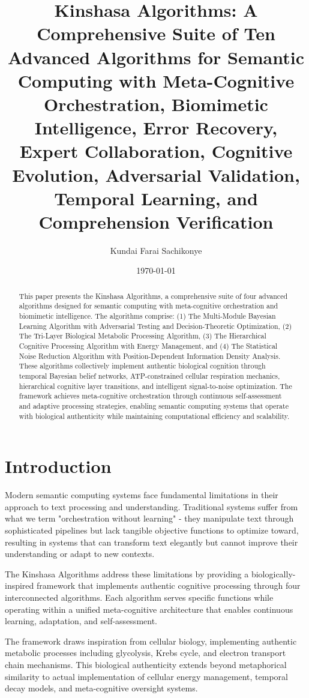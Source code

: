 \documentclass[12pt,a4paper]{article}
\title{Kinshasa Algorithms: A Comprehensive Suite of Ten Advanced Algorithms for Semantic Computing with Meta-Cognitive Orchestration, Biomimetic Intelligence, Error Recovery, Expert Collaboration, Cognitive Evolution, Adversarial Validation, Temporal Learning, and Comprehension Verification}
\author{Kundai Farai Sachikonye}
\date{\today}
\begin{document}
\maketitle

\begin{abstract}
This paper presents the Kinshasa Algorithms, a comprehensive suite of four advanced algorithms designed for semantic computing with meta-cognitive orchestration and biomimetic intelligence. The algorithms comprise: (1) The Multi-Module Bayesian Learning Algorithm with Adversarial Testing and Decision-Theoretic Optimization, (2) The Tri-Layer Biological Metabolic Processing Algorithm, (3) The Hierarchical Cognitive Processing Algorithm with Energy Management, and (4) The Statistical Noise Reduction Algorithm with Position-Dependent Information Density Analysis. These algorithms collectively implement authentic biological cognition through temporal Bayesian belief networks, ATP-constrained cellular respiration mechanics, hierarchical cognitive layer transitions, and intelligent signal-to-noise optimization. The framework achieves meta-cognitive orchestration through continuous self-assessment and adaptive processing strategies, enabling semantic computing systems that operate with biological authenticity while maintaining computational efficiency and scalability.
\end{abstract}

\section{Introduction}

Modern semantic computing systems face fundamental limitations in their approach to text processing and understanding. Traditional systems suffer from what we term "orchestration without learning" - they manipulate text through sophisticated pipelines but lack tangible objective functions to optimize toward, resulting in systems that can transform text elegantly but cannot improve their understanding or adapt to new contexts.

The Kinshasa Algorithms address these limitations by providing a biologically-inspired framework that implements authentic cognitive processing through four interconnected algorithms. Each algorithm serves specific functions while operating within a unified meta-cognitive architecture that enables continuous learning, adaptation, and self-assessment.

The framework draws inspiration from cellular biology, implementing authentic metabolic processes including glycolysis, Krebs cycle, and electron transport chain mechanisms. This biological authenticity extends beyond metaphorical similarity to actual implementation of cellular energy management, temporal decay models, and meta-cognitive oversight systems.
\end{document}
